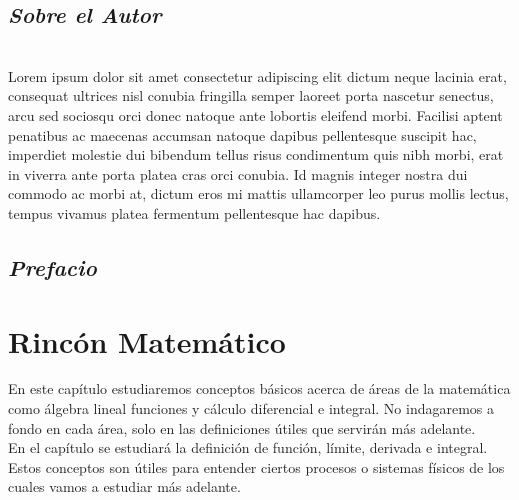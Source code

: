 


 



\restoregeometry
\tableofcontents
\thispagestyle{empty}
\newpage
\setcounter{page}{1}
\section*{\textbf{\textit{Sobre el Autor}}}

\lipsum[1-3] \\
Lorem ipsum dolor sit amet consectetur adipiscing elit dictum neque lacinia erat, consequat ultrices nisl conubia fringilla semper laoreet porta nascetur senectus, arcu sed sociosqu orci donec natoque ante lobortis eleifend morbi. Facilisi aptent penatibus ac maecenas accumsan natoque dapibus pellentesque suscipit hac, imperdiet molestie dui bibendum tellus risus condimentum quis nibh morbi, erat in viverra ante porta platea cras orci conubia. Id magnis integer nostra dui commodo ac morbi at, dictum eros mi mattis ullamcorper leo purus mollis lectus, tempus vivamus platea fermentum pellentesque hac dapibus.
\newpage
\section*{\textit{Prefacio}}
\lipsum[1-6]
\chapter{Rincón Matemático}
    En este capítulo estudiaremos conceptos básicos acerca de áreas de la matemática como álgebra lineal funciones y cálculo diferencial e integral. No indagaremos a fondo en cada área, solo en las definiciones útiles que servirán más adelante.\\
    
    En el capítulo se estudiará la definición de función, límite, derivada e integral. Estos conceptos son útiles para entender ciertos procesos o sistemas físicos de los cuales vamos a estudiar más adelante.
    \newpage
